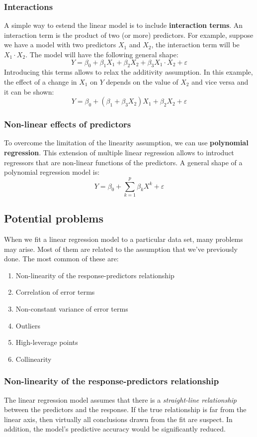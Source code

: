 \subsubsection*{Interactions}
A simple way to estend the linear model is to include \textbf{interaction terms}. An interaction term is the product of two (or more) predictors.
For example, suppose we have a model with two predictors $X_1$ and $X_2$, the interaction term will be $X_1 \cdot X_2$. The model will have the following general shape:
\[
    Y = \beta_0 + \beta_1 X_1 + \beta_2 X_2 + \beta_3 X_1 \cdot X_2 + \varepsilon
\]
Introducing this terms allows to relax the additivity assumption. In this example, the effect of a change in $X_1$ on $Y$ depends on the value of $X_2$ and vice versa and it can be shown:
\[
    Y = \beta_0 + (\beta_1+\beta_3X_2)X_1 + \beta_2X_2 + \varepsilon 
\]
\subsubsection*{Non-linear effects of predictors}
To overcome the limitation of the linearity assumption, we can use \textbf{polynomial regression}. This extension of multiple linear regression allows to introduct regressors that are non-linear functions of the predictors. 
A general shape of a polynomial regression model is:
\[
    Y = \beta_0 + \sum_{k=1}^p \beta_kX^k + \varepsilon
\]

\subsection*{Potential problems}
When we fit a linear regression model to a particular data set, many problems may arise. Most of them are related to the assumption that we've previously done. The most common of these are:

\begin{enumerate}
    \item Non-linearity of the response-predictors relationship
    \item Correlation of error terms
    \item Non-constant variance of error terms
    \item Outliers
    \item High-leverage points
    \item Collinearity
\end{enumerate}

\subsubsection*{Non-linearity of the response-predictors relationship}
The linear regression model assumes that there is a \textit{straight-line relationship} between the predictors and the response. If the true relationship is far from the linear axis, then virtually all conclusions drawn from the fit are suspect. In addition, the model's predictive accuracy would be significantly reduced.

